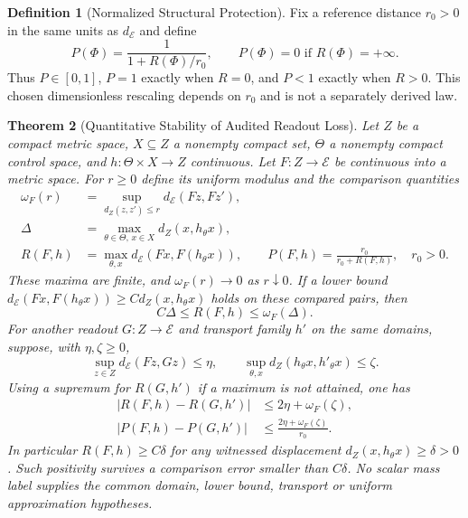 \documentclass[11pt,a4paper]{article}
\theoremstyle{plain}
\newtheorem{theorem}{Theorem}[section]
\theoremstyle{definition}
\newtheorem{definition}[theorem]{Definition}
\theoremstyle{remark}
\begin{document}
\begin{definition}[Normalized Structural Protection]\label{def:protection}
Fix a reference distance $r_0>0$ in the same units as $d_{\mathcal E}$ and define
\[
P(\Phi)=\frac{1}{1+R(\Phi)/r_0},\qquad P(\Phi)=0\text{ if }R(\Phi)=+\infty.
\]
Thus $P\in[0,1]$, $P=1$ exactly when $R=0$, and $P<1$ exactly when $R>0$. This chosen dimensionless rescaling depends on $r_0$ and is not a separately derived law.
\end{definition}

\begin{theorem}[Quantitative Stability of Audited Readout Loss]\label{thm:readout-loss-stability}
Let $Z$ be a compact metric space, $X\subseteq Z$ a nonempty compact set,
$\Theta$ a nonempty compact control space, and $h:\Theta\times X\to Z$
continuous. Let $F:Z\to\mathcal E$ be continuous into a metric space.
For $r\geq0$ define its uniform modulus and the comparison quantities
\[
\begin{aligned}
 \omega_F(r)&=\sup_{d_Z(z,z')\leq r}d_{\mathcal E}(Fz,Fz'),\\
 \Delta&=\max_{\theta\in\Theta,\,x\in X}d_Z(x,h_\theta x),\\
 R(F,h)&=\max_{\theta,x}d_{\mathcal E}(Fx,F(h_\theta x)),\qquad
 P(F,h)=\frac{r_0}{r_0+R(F,h)},\quad r_0>0.
\end{aligned}
\]
These maxima are finite, and $\omega_F(r)\to0$ as $r\downarrow0$. If a
lower bound $d_{\mathcal E}(Fx,F(h_\theta x))\geq C d_Z(x,h_\theta x)$
holds on these compared pairs, then
\[
 C\Delta\leq R(F,h)\leq\omega_F(\Delta).
\]
For another readout $G:Z\to\mathcal E$ and transport family $h'$ on the same
domains, suppose, with $\eta,\zeta\geq0$,
\[
 \sup_{z\in Z}d_{\mathcal E}(Fz,Gz)\leq\eta,
 \qquad \sup_{\theta,x}d_Z(h_\theta x,h'_\theta x)\leq\zeta.
\]
Using a supremum for $R(G,h')$ if a maximum is not attained, one has
\[
\begin{aligned}
 |R(F,h)-R(G,h')|&\leq2\eta+\omega_F(\zeta),\\
 |P(F,h)-P(G,h')|&\leq\frac{2\eta+\omega_F(\zeta)}{r_0}.
\end{aligned}
\]
In particular $R(F,h)\geq C\delta$ for any witnessed displacement
$d_Z(x,h_\theta x)\geq\delta>0$. Such positivity survives a comparison
error smaller than $C\delta$. No scalar mass label supplies the common
domain, lower bound, transport or uniform approximation hypotheses.
\end{theorem}
\end{document}
